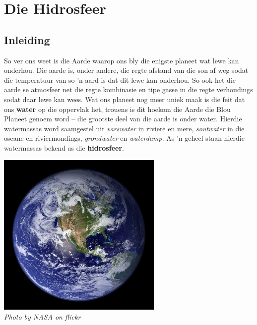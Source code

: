          \chapter{Die Hidrosfeer}

    \section{Inleiding}
            \nopagebreak
\begin{minipage}{.7\textwidth}
So ver ons weet is die Aarde waarop ons bly die enigste planeet wat lewe kan onderhou. Die aarde is, onder andere, die regte afstand van die son af weg sodat die temperatuur van so   'n aard is dat dit lewe kan onderhou. So ook het die aarde se atmosfeer net die regte kombinasie en tipe gasse in die regte verhoudings sodat daar lewe kan wees. Wat ons planeet nog meer uniek maak is die feit dat ons \textbf{water} op die oppervlak het, trouens is dit hoekom die Aarde die Blou Planeet genoem word – die grootste deel van die aarde is onder water. Hierdie watermassas word saamgestel uit \textsl{varswater} in riviere en mere, \textsl{soutwater} in die oseane en riviermondings, \textsl{grondwater} en \textsl{waterdamp}. As   'n geheel staan hierdie watermassas bekend as die \textbf{hidrosfeer}.
\end{minipage}
\begin{minipage}{.3\textwidth}
\begin{center}
 \includegraphics[width=0.6\textwidth]{photos/earth_space_nasa-flickr.jpg}\\
\textsl{Photo by NASA on flickr}
\end{center}

\end{minipage}


